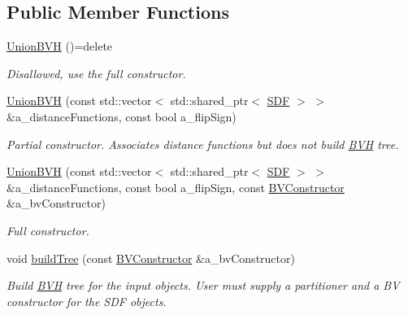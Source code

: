 \subsection*{Public Member Functions}
\begin{DoxyCompactItemize}
\item 
\mbox{\label{classUnionBVH_aa2d9a2e95e58a0d7dfb2b92283626cac}} 
\hyperlink{classUnionBVH_aa2d9a2e95e58a0d7dfb2b92283626cac}{Union\+B\+VH} ()=delete
\begin{DoxyCompactList}\small\item\em Disallowed, use the full constructor. \end{DoxyCompactList}\item 
\hyperlink{classUnionBVH_a6a0a50fcddc59dbb1c9b9444b0fce117}{Union\+B\+VH} (const std\+::vector$<$ std\+::shared\+\_\+ptr$<$ \hyperlink{classUnionBVH_a5d1d64d7cabf1000fc1a804d06e103cc}{S\+DF} $>$ $>$ \&a\+\_\+distance\+Functions, const bool a\+\_\+flip\+Sign)
\begin{DoxyCompactList}\small\item\em Partial constructor. Associates distance functions but does not build \hyperlink{namespaceBVH}{B\+VH} tree. \end{DoxyCompactList}\item 
\hyperlink{classUnionBVH_a9eb2c19a0fdc645e068c09398d3dd0f3}{Union\+B\+VH} (const std\+::vector$<$ std\+::shared\+\_\+ptr$<$ \hyperlink{classUnionBVH_a5d1d64d7cabf1000fc1a804d06e103cc}{S\+DF} $>$ $>$ \&a\+\_\+distance\+Functions, const bool a\+\_\+flip\+Sign, const \hyperlink{classUnionBVH_a09561e026cd6a7da1a7dbdbad5eea2c2}{B\+V\+Constructor} \&a\+\_\+bv\+Constructor)
\begin{DoxyCompactList}\small\item\em Full constructor. \end{DoxyCompactList}\item 
void \hyperlink{classUnionBVH_a97769f4c449610b681a70b93c99a40ca}{build\+Tree} (const \hyperlink{classUnionBVH_a09561e026cd6a7da1a7dbdbad5eea2c2}{B\+V\+Constructor} \&a\+\_\+bv\+Constructor)
\begin{DoxyCompactList}\small\item\em Build \hyperlink{namespaceBVH}{B\+VH} tree for the input objects. User must supply a partitioner and a BV constructor for the S\+DF objects. \end{DoxyCompactList}\item 
\mbox{\label{classUnionBVH_aac0a1f16ad0a273e72c8bcd15b80f336}} 

\end{DoxyCompactItemize}
